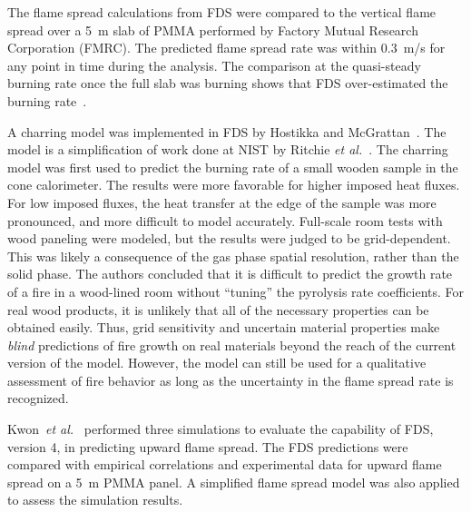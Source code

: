 The flame spread  calculations from FDS were compared  to the vertical flame  spread over  a 5~m  slab of  PMMA performed  by  Factory Mutual
Research  Corporation (FMRC).   The  predicted flame  spread rate  was within  0.3~m/s  for any  point  in  time  during the  analysis.   The
comparison at  the quasi-steady  burning rate once  the full  slab was burning     shows    that     FDS    over-estimated     the    burning
rate~\cite{Ma:2,Ma:3}.

A   charring  model   was   implemented  in   FDS   by  Hostikka   and McGrattan~\cite{Hostikka:2}.  The model  is a  simplification  of work done at
NIST by Ritchie  {\em et al.}~\cite{Ritchie:1}.  The charring model was  first used to  predict the burning  rate of a  small wooden sample in the
cone calorimeter.  The results were  more favorable for higher imposed heat fluxes. For  low imposed fluxes, the heat transfer at the edge  of the
sample was more pronounced,  and more difficult to model  accurately.   Full-scale room  tests  with  wood paneling  were modeled, but  the results
were  judged to be grid-dependent.  This was likely a consequence of the  gas phase spatial resolution, rather than the solid phase. The authors
concluded that it is difficult to predict the growth rate of a fire  in a wood-lined room without ``tuning'' the pyrolysis rate  coefficients. For
real  wood products, it  is unlikely that all  of the  necessary properties can  be obtained  easily. Thus, grid sensitivity  and uncertain  material
properties make  {\em blind} predictions of fire  growth on real materials beyond  the reach of the current version of the model. However, the model
can still be used for a qualitative assessment  of fire behavior as long  as the uncertainty in the flame spread rate is recognized.

Kwon~{\em et al.}~\cite{Kwon:Fire_Technology_2007} performed three simulations to evaluate the capability of
FDS, version 4, in predicting upward flame spread. The FDS predictions were
compared with empirical correlations and experimental data for upward flame spread
on a 5~m PMMA panel. A simplified flame spread model was also applied to assess the simulation results.

